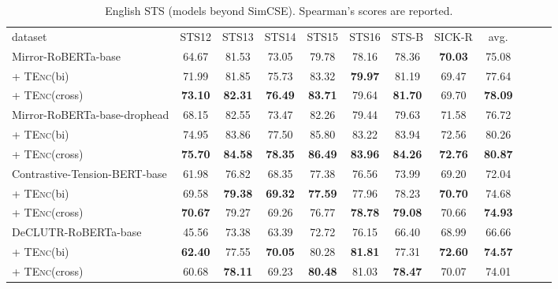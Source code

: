 \documentclass{article} \usepackage{iclr2021_conference,times}
\newcommand{\tenc}{\textsc{TEnc}\xspace}
\begin{document}
\begin{table}[!t] \setlength{\tabcolsep}{4.0pt}
\centering
\small
\begin{tabular}{lccccccccccc}
\cmidrule[1.5pt]{1-10}
dataset  & STS12 & STS13 & STS14 & STS15 & STS16 & STS-B & SICK-R & avg.\\
\cmidrule[1.5pt]{1-10}
Mirror-RoBERTa-base & 64.67 & 81.53 & 73.05 & 79.78 & 78.16 & 78.36 & \textbf{70.03} & 75.08 \\
 + \tenc (bi) & 71.99 & 81.85 & 75.73 & 83.32 & \textbf{79.97} & 81.19 & 69.47 & 77.64 \\
 + \tenc (cross) & \textbf{73.10} & \textbf{82.31} & \textbf{76.49} & \textbf{83.71} & 79.64 & \textbf{81.70} & 69.70 & \textbf{78.09} \\
\cmidrule[1.0pt]{1-10}
 Mirror-RoBERTa-base-drophead &  68.15 & 82.55 & 73.47 & 82.26 & 79.44 & 79.63 & 71.58 & 76.72\\
 + \tenc (bi) & 74.95 & 83.86 & 77.50 & 85.80 & 83.22 & 83.94 & 72.56 & 80.26  \\
 + \tenc (cross) & \textbf{75.70} & \textbf{84.58} & \textbf{78.35} & \textbf{86.49} & \textbf{83.96} & \textbf{84.26} & \textbf{72.76} & \textbf{80.87} \\
 \cmidrule[1.0pt]{1-10}
Contrastive-Tension-BERT-base & 61.98 & 76.82 & 68.35 & 77.38 & 76.56 & 73.99 & 69.20 & 72.04 \\
+ \tenc (bi) & 69.58 & \textbf{79.38} & \textbf{69.32} & \textbf{77.59} & 77.96 & 78.23 & \textbf{70.70} & 74.68 \\
+ \tenc (cross) & \textbf{70.67} & 79.27 & 69.26 & 76.77 & \textbf{78.78} & \textbf{79.08} & 70.66 & \textbf{74.93} \\
\cmidrule[1.0pt]{1-10}
DeCLUTR-RoBERTa-base & 45.56 & 73.38 & 63.39 & 72.72 & 76.15 & 66.40 & 68.99 & 66.66 \\
+ \tenc (bi) & \textbf{62.40} & 77.55 & \textbf{70.05} & 80.28 & \textbf{81.81} & 77.31 & \textbf{72.60} & \textbf{74.57} \\
+ \tenc (cross) & 60.68 & \textbf{78.11} & 69.23 & \textbf{80.48} & 81.03 & \textbf{78.47} & 70.07 & 74.01 \\
\cmidrule[1.5pt]{1-10}
\end{tabular}
\caption{English STS (models beyond SimCSE).  Spearman's  scores are reported.}
\label{tab:sts_mirrorbert}
\end{table}
\end{document}
